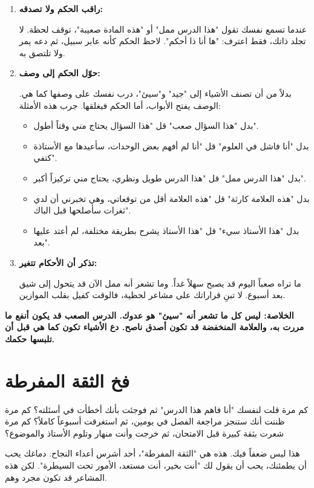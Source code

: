 \documentclass[12pt,a4paper]{book}
\newcommand{\importantAr}[1]{%
	\begin{important}
		\bfseries #1
	\end{important}
}
\begin{document}
\begin{enumerate}
	\item \textbf{راقب الحكم ولا تصدقه:}
	
	عندما تسمع نفسك تقول "هذا الدرس ممل" أو "هذه المادة صعيبة"، توقف لحظة. لا تجلد ذاتك، فقط اعترف: "ها أنا ذا أحكم". لاحظ الحكم كأنه عابر سبيل، ثم دعه يمر ولا تلتصق به.
	
	\item \textbf{حوّل الحكم إلى وصف:}
	
	بدلاً من أن تصنف الأشياء إلى "جيد" و"سيئ"، درب نفسك على وصفها كما هي. الوصف يفتح الأبواب، أما الحكم فيغلقها. جرب هذه الأمثلة:
	
	\begin{itemize}
		\item بدل "هذا السؤال صعب" قل "هذا السؤال يحتاج مني وقتاً أطول".
		\item بدل "أنا فاشل في العلوم" قل "أنا لم أفهم بعض الوحدات، سأعيدها مع الأستاذة كتفي".
		\item بدل "هذا الدرس ممل" قل "هذا الدرس طويل ونظري، يحتاج مني تركيزاً أكبر".
		\item بدل "هذه العلامة كارثة" قل "هذه العلامة أقل من توقعاتي، وهي تخبرني أن لدي ثغرات سأصلحها قبل الباك".
		\item بدل "هذا الأستاذ سيء" قل "هذا الأستاذ يشرح بطريقة مختلفة، لم أعتد عليها بعد".
	\end{itemize}
	
	\item \textbf{تذكر أن الأحكام تتغير:}
	
	ما تراه صعباً اليوم قد يصبح سهلاً غداً. وما تشعر أنه ممل الآن قد يتحول إلى شيق بعد أسبوع. لا تبنِ قراراتك على مشاعر لحظية، فالوقت كفيل بقلب الموازين.
\end{enumerate}

\importantAr{الخلاصة: ليس كل ما تشعر أنه "سيئ" هو عدوك. الدرس الصعب قد يكون أنفع ما مررت به، والعلامة المنخفضة قد تكون أصدق ناصح. دع الأشياء تكون كما هي قبل أن تلبسها حكمك.}
  
\section{فخ الثقة المفرطة}
\label{sec:overconfidence}

كم مرة قلت لنفسك "أنا فاهم هذا الدرس" ثم فوجئت بأنك أخطأت في أسئلته؟ كم مرة ظننت أنك ستنجز مراجعة الفصل في يومين، ثم استغرقت أسبوعاً كاملاً؟ كم مرة شعرت بثقة كبيرة قبل الامتحان، ثم خرجت وأنت منهار وتلوم الأستاذ والموضوع؟

هذا ليس ضعفاً فيك. هذه هي "الثقة المفرطة"، أحد أشرس أعداء النجاح. دماغك يحب أن يطمئنك، يحب أن يقول لك "أنت بخير، أنت مستعد، الأمور تحت السيطرة". لكن هذه المشاعر قد تكون مجرد وهم.
\end{document}
